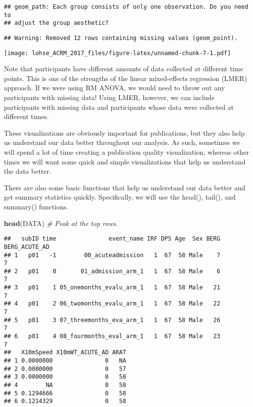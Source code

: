\documentclass[]{article}
\newenvironment{Shaded}{\begin{snugshade}}{\end{snugshade}}
\newcommand{\KeywordTok}[1]{\textcolor[rgb]{0.13,0.29,0.53}{\textbf{{#1}}}}
\newcommand{\CommentTok}[1]{\textcolor[rgb]{0.56,0.35,0.01}{\textit{{#1}}}}
\newcommand{\NormalTok}[1]{{#1}}
\begin{document}
\begin{verbatim}
## geom_path: Each group consists of only one observation. Do you need to
## adjust the group aesthetic?
\end{verbatim}

\begin{verbatim}
## Warning: Removed 12 rows containing missing values (geom_point).
\end{verbatim}

\texttt{[image: lohse\_ACRM\_2017\_files/figure-latex/unnamed-chunk-7-1.pdf]}

Note that participants have different amounts of data collected at
different time points. This is one of the strengths of the linear
mixed-effects regression (LMER) approach. If we were using RM ANOVA, we
would need to throw out any participants with missing data! Using LMER,
however, we can include participants with missing data and participants
whose data were collected at different times.

These visualizations are obviously important for publications, but they
also help us understand our data better throughout our analysis. As
such, sometimes we will spend a lot of time creating a publication
quality visualization, whereas other times we will want some quick and
simple visualizations that help us understand the data better.

There are also some basic functions that help us understand our data
better and get summary statistics quickly. Specifically, we will use the
head(), tail(), and summary() functions.

\begin{Shaded}
\begin{Highlighting}[]
\KeywordTok{head}\NormalTok{(DATA) }\CommentTok{# Peak at the top rows.}
\end{Highlighting}
\end{Shaded}

\begin{verbatim}
##   subID time               event_name IRF DPS Age  Sex BERG BERG_ACUTE_AD
## 1   p01   -1        00_acuteadmission   1  67  58 Male    7             7
## 2   p01    0       01_admission_arm_1   1  67  58 Male    6             7
## 3   p01    1 05_onemonths_evalu_arm_1   1  67  58 Male   21             7
## 4   p01    2 06_twomonths_evalu_arm_1   1  67  58 Male   22             7
## 5   p01    3 07_threemonths_eva_arm_1   1  67  58 Male   26             7
## 6   p01    4 08_fourmonths_eval_arm_1   1  67  58 Male   23             7
##   X10mSpeed X10mWT_ACUTE_AD ARAT
## 1 0.0000000               0   NA
## 2 0.0000000               0   57
## 3 0.0000000               0   58
## 4        NA               0   58
## 5 0.1294666               0   58
## 6 0.1214329               0   58
\end{verbatim}
\end{document}
